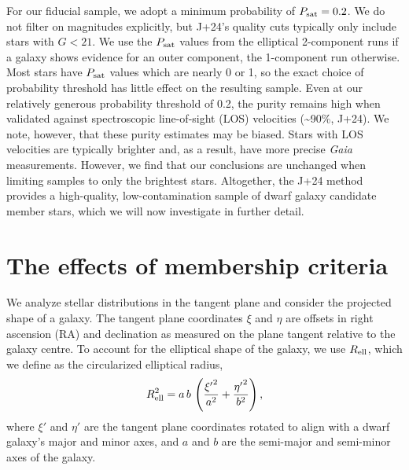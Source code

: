 For our fiducial sample, we adopt a minimum probability of
\(P_{\rm sat} = 0.2\). We do not filter on magnitudes explicitly, but
J+24's quality cuts typically only include stars with \(G < 21\). We use
the \(P_{\rm sat}\) values from the elliptical 2-component runs if a
galaxy shows evidence for an outer component, the 1-component run
otherwise. Most stars have \(P_{\rm  sat}\) values which are nearly 0 or
1, so the exact choice of probability threshold has little effect on the
resulting sample. Even at our relatively generous probability threshold
of 0.2, the purity remains high when validated against spectroscopic
line-of-sight (LOS) velocities (\textasciitilde90\%, J+24). We note,
however, that these purity estimates may be biased. Stars with LOS
velocities are typically brighter and, as a result, have more precise
\emph{Gaia} measurements. However, we find that our conclusions are
unchanged when limiting samples to only the brightest stars. Altogether,
the J+24 method provides a high-quality, low-contamination sample of
dwarf galaxy candidate member stars, which we will now investigate in
further detail.

\section{The effects of membership
criteria}\label{the-effects-of-membership-criteria}

We analyze stellar distributions in the tangent plane and consider the
projected shape of a galaxy. The tangent plane coordinates \(\xi\) and
\(\eta\) are offsets in right ascension (RA) and declination as measured
on the plane tangent relative to the galaxy centre. To account for the
elliptical shape of the galaxy, we use \(R_{\rm ell}\), which we define
as the circularized elliptical radius, \begin{equation}{
R_{\rm ell}^2 = a\,b\,\left(\frac{{\xi'}^2}{a^2} + \frac{{\eta'}^2}{b^2} \right),
}\end{equation} where \(\xi'\) and \(\eta'\) are the tangent plane
coordinates rotated to align with a dwarf galaxy's major and minor axes,
and \(a\) and \(b\) are the semi-major and semi-minor axes of the
galaxy.

